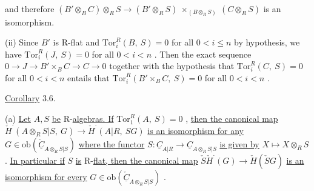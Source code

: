 and therefore $(B'\otimes_B C)\otimes_R S \to (B'\otimes_R S)\ \times_{(B\otimes_R S)}\ (C \otimes_R S)$  is an isomorphism.

(ii)  Since  $B'$  is R-flat and  $\mathrm{Tor}^R_i(B,\ S) = 0$  for all  $0 < i \leq n$   by hypothesis, we have  $\mathrm{Tor}^R_i(J,\ S) = 0$  for all  $0 < i < n$  . Then the exact sequence  $0 \to J \to B'\times_B C \to C \to 0$  together with the hypothesis that  $\mathrm{Tor}^R_i(C,\ S) = 0$  for all  $0 < i < n$  entails that  $\mathrm{Tor}^R_i(B'\times_B C,\ S) = 0$  for all  $0 < i < n$  .


\underline{Corollary} 3.6.

(a)  \underline{Let}  $A, S$  \underline{be} R-\underline{algebras. If}  $\mathrm{Tor}^R_1(A,\ S) = 0$  , \underline{then the canonical map}  $\check{H}^{\cdot}(A\otimes_R S|S,\ G) \to \check{H}^{\cdot}(A|R,\ SG)$  \underline{is an isomorphism for any}  $G \in \mathrm{ob}(\check{\underline{C}}_{A\otimes_R S|S})$  \underline{where the functor}  $S : \underline{C}_{A|R} \to \underline{C}_{A\otimes_R S|S}$  \underline{is given by}  $X \longmapsto X\otimes_R S$  . \underline{In particular if}  $S$  \underline{is} R-\underline{flat, then the canonical map}  $\check{S}\check{H}^{\cdot}(G) \to \check{H}(\check{S}G)$  \underline{is an isomorphism for every}  $G \in \mathrm{ob}(\check{\underline{C}}_{A\otimes_R S|S})$  .

